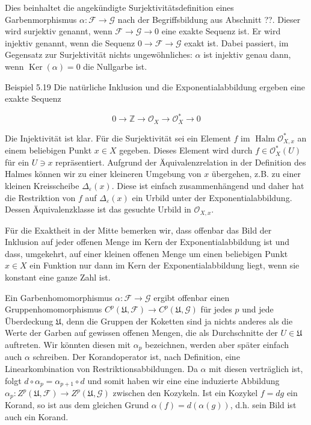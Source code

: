 \documentclass[10pt, letterpaper]{article}
\begin{document}
Dies beinhaltet die angekündigte Surjektivitätsdefinition eines Garbenmorphismus $\alpha: \mathcal{F} \rightarrow \mathcal{G}$ nach der Begriffsbildung aus Abschnitt ??. Dieser wird surjektiv genannt, wenn $\mathcal{F} \rightarrow \mathcal{G} \rightarrow 0$ eine exakte Sequenz ist. Er wird injektiv genannt, wenn die Sequenz $0 \rightarrow \mathcal{F} \rightarrow \mathcal{G}$ exakt ist. Dabei passiert, im Gegensatz zur Surjektivität nichts ungewöhnliches: $\alpha$ ist injektiv genau dann, wenn $\operatorname{Ker}(\alpha)=0$ die Nullgarbe ist.

Beispiel 5.19 Die natürliche Inklusion und die Exponentialabbildung ergeben eine exakte Sequenz

$$
0 \rightarrow \mathbb{Z} \rightarrow \mathcal{O}_{X} \rightarrow \mathcal{O}_{X}^{*} \rightarrow 0
$$

Die Injektivität ist klar. Für die Surjektivität sei ein Element $f$ im $\operatorname{Halm} \mathcal{O}_{X, x}^{*}$ an einem beliebigen Punkt $x \in X$ gegeben. Dieses Element wird durch $f \in \mathcal{O}_{X}^{*}(U)$ für ein $U \ni x$ repräsentiert. Aufgrund der Äquivalenzrelation in der Definition des Halmes können wir zu einer kleineren Umgebung von $x$ übergehen, z.B. zu einer kleinen Kreisscheibe $\Delta_{\varepsilon}(x)$. Diese ist einfach zusammenhängend und daher hat die Restriktion von $f$ auf $\Delta_{\varepsilon}(x)$ ein Urbild unter der Exponentialabbildung. Dessen Äquivalenzklasse ist das gesuchte Urbild in $\mathcal{O}_{X, x}$.

Für die Exaktheit in der Mitte bemerken wir, dass offenbar das Bild der Inklusion auf jeder offenen Menge im Kern der Exponentialabbildung ist und dass, umgekehrt, auf einer kleinen offenen Menge um einen beliebigen Punkt $x \in X$ ein Funktion nur dann im Kern der Exponentialabbildung liegt, wenn sie konstant eine ganze Zahl ist.

Ein Garbenhomomorphismus $\alpha: \mathcal{F} \rightarrow \mathcal{G}$ ergibt offenbar einen Gruppenhomomorphismus $C^{p}(\mathfrak{U}, \mathcal{F}) \rightarrow C^{p}(\mathfrak{U}, \mathcal{G})$ für jedes $p$ und jede Überdeckung $\mathfrak{U}$, denn die Gruppen der Koketten sind ja nichts anderes als die Werte der Garben auf gewissen offenen Mengen, die als Durchschnitte der $U \in \mathfrak{U}$ auftreten. Wir könnten diesen mit $\alpha_{p}$ bezeichnen, werden aber später einfach auch $\alpha$ schreiben. Der Korandoperator ist, nach Definition, eine Linearkombination von Restriktionsabbildungen. Da $\alpha$ mit diesen verträglich ist, folgt $d \circ \alpha_{p}=\alpha_{p+1} \circ d$ und somit haben wir eine eine induzierte Abbildung $\alpha_{p}: Z^{p}(\mathfrak{U}, \mathcal{F}) \rightarrow Z^{p}(\mathfrak{U}, \mathcal{G})$ zwischen den Kozykeln. Ist ein Kozykel $f=d g$ ein Korand, so ist aus dem gleichen Grund $\alpha(f)=d(\alpha(g))$, d.h. sein Bild ist auch ein Korand.
\end{document}
